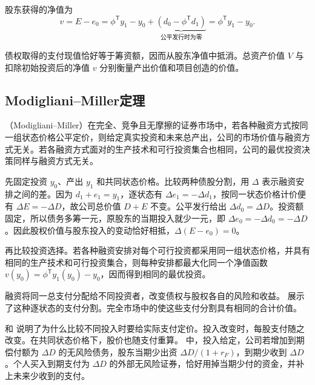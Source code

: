 股东获得的净值为
\[
 v=E-e_0=\phi^{\mathsf T}y_1-y_0
 +\underbrace{(d_0-\phi^{\mathsf T}d_1)}_{\text{公平发行时为零}}
 =\phi^{\mathsf T}y_1-y_0.
\]

债权取得的支付现值恰好等于筹资额，因而从股东净值中抵消。总资产价值 $V$ 与扣除初始投资后的净值 $v$ 分别衡量产出价值和项目创造的价值。

\subsection{Modigliani--Miller定理}
\begin{tcolorbox}[knowledge]
（Modigliani--Miller）在完全、竞争且无摩擦的证券市场中，若各种融资方式按同一组状态价格公平定价，则给定真实投资和未来总产出，公司的市场价值与融资方式无关。若各融资方式面对的生产技术和可行投资集合也相同，公司的最优投资决策同样与融资方式无关。
\end{tcolorbox}

\begin{solution}[label-content={证明},blank-type=none]
先固定投资 $y_0$、产出 $y_1$ 和共同状态价格。比较两种债股分割，用 $\Delta$ 表示融资安排之间的差。因为 $d_1+e_1=y_1$，逐状态有 $\Delta e_1=-\Delta d_1$，按同一状态价格计价便有 $\Delta E=-\Delta D$，故公司总价值 $D+E$ 不变。公平发行给出 $\Delta d_0=\Delta D$。投资额固定，所以债务多筹一元，原股东的当期投入就少一元，即 $\Delta e_0=-\Delta d_0=-\Delta D$。因此股权价值与股东投入的变动恰好相抵，$\Delta(E-e_0)=0$。

再比较投资选择。若各种融资安排对每个可行投资都采用同一组状态价格，并具有相同的生产技术和可行投资集合，则每种安排都最大化同一个净值函数 $v(y_0)=\phi^{\mathsf T}y_1(y_0)-y_0$，因而得到相同的最优投资。
\end{solution}

融资将同一总支付分配给不同投资者，改变债权与股权各自的风险和收益。 展示了这种逐状态的支付分割。完全市场中的使这些支付分割具有相同的合计价值。


 和 说明了为什么比较不同投入时要给实际支付定价。投入改变时，每股支付随之改变。在共同状态价格下，股价也随支付重算。 中，投入给定，公司若增加到期偿付额为 $\Delta D$ 的无风险债务，股东当期少出资 $\Delta D/(1+r_F)$，到期少收到 $\Delta D$。个人买入到期支付为 $\Delta D$ 的外部无风险证券，恰好用掉当期少付的资金，并补上未来少收到的支付。


